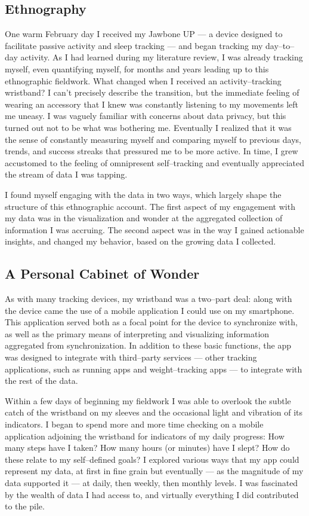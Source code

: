 \documentclass{article}
\begin{document}
\subsection*{Ethnography}
One warm February day I received my Jawbone UP
--- a device designed to facilitate passive activity and sleep tracking ---
and began tracking my day--to--day activity.
As I had learned during my literature review,
I was already tracking myself,
even quantifying myself,
for months and years leading up to this ethnographic fieldwork.
What changed when I received an activity--tracking wristband? I can't precisely describe the transition,
but the immediate feeling of wearing an accessory that I knew was constantly listening to my movements left me uneasy.
I was vaguely familiar with concerns about data privacy,
but this turned out not to be what was bothering me.
Eventually I realized that it was the sense of constantly measuring myself and comparing myself to previous days,
trends,
and success streaks that pressured me to be more active.
In time,
I grew accustomed to the feeling of omnipresent self--tracking and eventually appreciated the stream of data I was tapping.

I found myself engaging with the data in two ways,
which largely shape the structure of this ethnographic account.
The first aspect of my engagement with my data was in the visualization and wonder at the aggregated collection of information I was accruing.
The second aspect was in the way I gained actionable insights,
and changed my behavior,
based on the growing data I collected.

\subsection*{A Personal Cabinet of Wonder}
As with many tracking devices,
my wristband was a two--part deal:
along with the device came the use of a mobile application I could use on my smartphone.
This application served both as a focal point for the device to synchronize with,
as well as the primary means of interpreting and visualizing information aggregated from synchronization.
In addition to these basic functions,
the app was designed to integrate with third--party services
--- other tracking applications,
such as running apps and weight--tracking apps
--- to integrate with the rest of the data.

Within a few days of beginning my fieldwork I was able to overlook the subtle catch of the wristband on my sleeves and the occasional light and vibration of its indicators.
I began to spend more and more time checking on a mobile application adjoining the wristband for indicators of my daily progress:
How many steps have I taken? How many hours (or minutes) have I slept? How do these relate to my self--defined goals? I explored  various ways that my app could represent my data,
at first in fine grain but eventually
--- as the magnitude of my data supported it ---
at daily,
then weekly,
then monthly levels.
I was fascinated by the wealth of data I had access to,
and virtually everything I did contributed to the pile.
\end{document}
